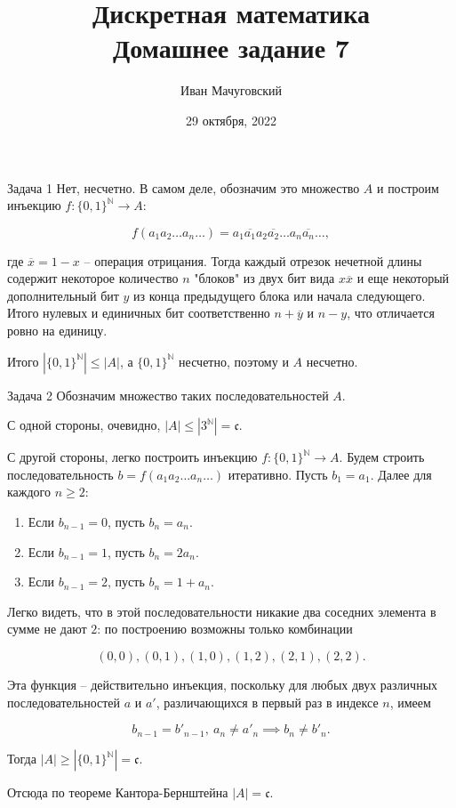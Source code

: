 \documentclass{article}
\date{29 октября, 2022}
\title{Дискретная математика \\ \Large Домашнее задание 7}
\author{Иван Мачуговский}
\newcommand{\abs}[1]{\left\lvert#1\right\rvert}
\newcommand{\N}{\mathbb{N}}
\newcommand{\continuum}{\mathfrak{c}}
\begin{document}
	\maketitle

	\begin{section}{Задача 1}
		Нет, несчетно. В самом деле, обозначим это множество $A$ и построим инъекцию $f: \{0, 1\}^{\N} \to A$:

		\begin{equation*}
			f(a_1 a_2 \dots a_n \dots) = a_1 \overline{a_1} a_2 \overline{a_2} \dots a_n \overline{a_n} \dots,
		\end{equation*}

		где $\overline{x} = 1 - x$ -- операция отрицания. Тогда каждый отрезок нечетной длины содержит некоторое количество $n$ "блоков" из двух бит вида $x \overline{x}$ и еще некоторый дополнительный бит $y$ из конца предыдущего блока или начала следующего. Итого нулевых и единичных бит соответственно $n + \overline{y}$ и $n - y$, что отличается ровно на единицу.

		Итого $\abs{\{0, 1\}^{\N}} \le \abs{A}$, а $\{0, 1\}^{\N}$ несчетно, поэтому и $A$ несчетно.
	\end{section}

	\begin{section}{Задача 2}
		Обозначим множество таких последовательностей $A$.

		С одной стороны, очевидно, $\abs{A} \le \abs{3^{\N}} = \continuum$.

		С другой стороны, легко построить инъекцию $f: \{0, 1\}^{\N} \to A$. Будем строить последовательность $b = f(a_1 a_2 \dots a_n \dots)$ итеративно. Пусть $b_1 = a_1$. Далее для каждого $n \ge 2$:

		\begin{enumerate}
			\item Если $b_{n-1} = 0$, пусть $b_n = a_n$.
			\item Если $b_{n-1} = 1$, пусть $b_n = 2 a_n$.
			\item Если $b_{n-1} = 2$, пусть $b_n = 1 + a_n$.
		\end{enumerate}

		Легко видеть, что в этой последовательности никакие два соседних элемента в сумме не дают $2$: по построению возможны только комбинации

		\begin{equation*}
			(0, 0), (0, 1), (1, 0), (1, 2), (2, 1), (2, 2).
		\end{equation*}

		Эта функция -- действительно инъекция, поскольку для любых двух различных последовательностей $a$ и $a'$, различающихся в первый раз в индексе $n$, имеем

		\begin{equation*}
			b_{n-1} = b'_{n-1}, \ a_n \ne a'_n \implies b_n \ne b'_n.
		\end{equation*}

		Тогда $\abs{A} \ge \abs{\{0, 1\}^{\N}} = \continuum$.

		Отсюда по теореме Кантора-Бернштейна $\abs{A} = \continuum$.
	\end{section}
\end{document}
